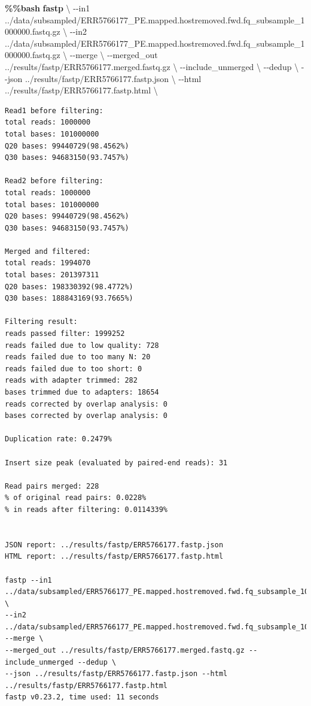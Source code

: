 \documentclass[
  letterpaper,
]{book}
\newenvironment{Shaded}{}{}
\newcommand{\AttributeTok}[1]{\textcolor[rgb]{0.84,0.23,0.29}{#1}}
\newcommand{\DataTypeTok}[1]{\textcolor[rgb]{0.84,0.23,0.29}{#1}}
\newcommand{\ExtensionTok}[1]{\textcolor[rgb]{0.84,0.23,0.29}{\textbf{#1}}}
\newcommand{\NormalTok}[1]{\textcolor[rgb]{0.14,0.16,0.18}{#1}}
\begin{document}
\begin{Shaded}
\begin{Highlighting}[]
\ExtensionTok{\%\%bash}
\ExtensionTok{fastp} \DataTypeTok{\textbackslash{}}
    \AttributeTok{{-}{-}in1}\NormalTok{ ../data/subsampled/ERR5766177\_PE.mapped.hostremoved.fwd.fq\_subsample\_1000000.fastq.gz }\DataTypeTok{\textbackslash{}}
    \AttributeTok{{-}{-}in2}\NormalTok{ ../data/subsampled/ERR5766177\_PE.mapped.hostremoved.fwd.fq\_subsample\_1000000.fastq.gz }\DataTypeTok{\textbackslash{}}
    \AttributeTok{{-}{-}merge} \DataTypeTok{\textbackslash{}}
    \AttributeTok{{-}{-}merged\_out}\NormalTok{ ../results/fastp/ERR5766177.merged.fastq.gz }\DataTypeTok{\textbackslash{}}
    \AttributeTok{{-}{-}include\_unmerged} \DataTypeTok{\textbackslash{}}
    \AttributeTok{{-}{-}dedup} \DataTypeTok{\textbackslash{}}
    \AttributeTok{{-}{-}json}\NormalTok{ ../results/fastp/ERR5766177.fastp.json }\DataTypeTok{\textbackslash{}}
    \AttributeTok{{-}{-}html}\NormalTok{ ../results/fastp/ERR5766177.fastp.html }\DataTypeTok{\textbackslash{}}
\end{Highlighting}
\end{Shaded}

\begin{verbatim}
Read1 before filtering:
total reads: 1000000
total bases: 101000000
Q20 bases: 99440729(98.4562%)
Q30 bases: 94683150(93.7457%)

Read2 before filtering:
total reads: 1000000
total bases: 101000000
Q20 bases: 99440729(98.4562%)
Q30 bases: 94683150(93.7457%)

Merged and filtered:
total reads: 1994070
total bases: 201397311
Q20 bases: 198330392(98.4772%)
Q30 bases: 188843169(93.7665%)

Filtering result:
reads passed filter: 1999252
reads failed due to low quality: 728
reads failed due to too many N: 20
reads failed due to too short: 0
reads with adapter trimmed: 282
bases trimmed due to adapters: 18654
reads corrected by overlap analysis: 0
bases corrected by overlap analysis: 0

Duplication rate: 0.2479%

Insert size peak (evaluated by paired-end reads): 31

Read pairs merged: 228
% of original read pairs: 0.0228%
% in reads after filtering: 0.0114339%


JSON report: ../results/fastp/ERR5766177.fastp.json
HTML report: ../results/fastp/ERR5766177.fastp.html

fastp --in1 ../data/subsampled/ERR5766177_PE.mapped.hostremoved.fwd.fq_subsample_1000000.fastq.gz \
--in2 ../data/subsampled/ERR5766177_PE.mapped.hostremoved.fwd.fq_subsample_1000000.fastq.gz --merge \
--merged_out ../results/fastp/ERR5766177.merged.fastq.gz --include_unmerged --dedup \
--json ../results/fastp/ERR5766177.fastp.json --html ../results/fastp/ERR5766177.fastp.html
fastp v0.23.2, time used: 11 seconds
\end{verbatim}
\end{document}
